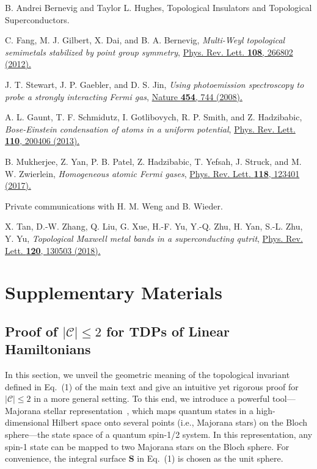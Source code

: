 \documentclass[aps,prl,floatfix,twocolumn,reprint]{revtex4}
\begin{document}
\begin{thebibliography}{99}
 B. Andrei Bernevig and Taylor L. Hughes, Topological Insulators and Topological Superconductors.

 C. Fang, M. J. Gilbert, X. Dai, and B. A. Bernevig, \textit{Multi-Weyl topological semimetals stabilized by point group symmetry}, \href{https://doi.org/10.1103/PhysRevLett.108.266802}{Phys.
Rev. Lett. {\bf{108}}, 266802 (2012).}

 J. T. Stewart, J. P. Gaebler, and D. S. Jin, \textit{Using
photoemission spectroscopy to probe a strongly interacting Fermi gas}, \href{https://doi.org/10.1038/nature07172}%
{Nature {\textbf{454}}, 744 (2008).}

 A. L. Gaunt, T. F. Schmidutz, I. Gotlibovych, R. P. Smith,
and Z. Hadzibabic, \textit{Bose-Einstein condensation of atoms in a uniform potential}, \href{https://doi.org/10.1103/PhysRevLett.110.200406}{Phys. Rev. Lett. {\bf{110}}, 200406 (2013).}

 B. Mukherjee, Z. Yan, P. B. Patel, Z. Hadzibabic, T. Yefsah,
J. Struck, and M. W. Zwierlein, \textit{Homogeneous atomic Fermi gases}, \href{https://doi.org/10.1103/PhysRevLett.118.123401}{Phys. Rev. Lett. {\bf{118}}, 123401 (2017).}

 Private communications with H. M. Weng and B. Wieder.

 X. Tan, D.-W. Zhang, Q. Liu, G. Xue, H.-F. Yu, Y.-Q. Zhu, H.
Yan, S.-L. Zhu, Y. Yu, \textit{Topological Maxwell metal bands in a superconducting qutrit}, \href{https://doi.org/10.1103/PhysRevLett.120.130503}{Phys. Rev. Lett. {\bf{120}}, 130503 (2018).}
\end{thebibliography}

\clearpage
\onecolumngrid
\appendix
\section{Supplementary Materials}
\subsection{Proof of $|\mathcal{C}|\leq 2$ for TDPs of Linear Hamiltonians} 

In this section, we unveil the geometric meaning of the topological
invariant defined in Eq.~(1) of the main text and give an intuitive yet rigorous
proof for $|\mathcal{C}|\leq 2$ in a more general setting. To this end, we
introduce a powerful tool---Majorana stellar representation~\cite{majorana1}, 
which maps quantum states in a high-dimensional Hilbert space onto several
points (i.e., Majorana stars) on the Bloch sphere---the state space of a quantum
spin-1/2 system.  In this representation, any spin-1 state can be mapped to
two Majorana stars on the Bloch sphere. For convenience, the integral
surface $\bm{S}$ in Eq.~(1) is chosen as the unit sphere.
\end{document}

